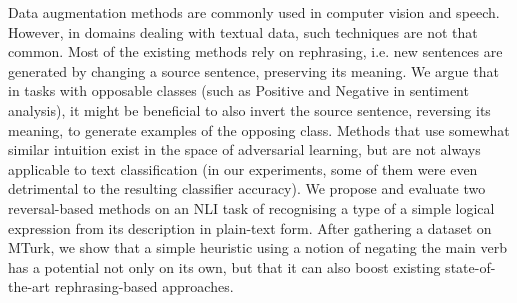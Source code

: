 Data augmentation methods are commonly used in computer vision and speech. However, in domains dealing with textual data, such techniques are not that common. Most of the existing methods rely on rephrasing, i.e. new sentences are generated by changing a source sentence, preserving its meaning. We argue that in tasks with opposable classes (such as Positive and Negative in sentiment analysis), it might be beneficial to also invert the source sentence, reversing its meaning, to generate examples of the opposing class. Methods that use somewhat similar intuition exist in the space of adversarial learning, but are not always applicable to text classification (in our experiments, some of them were even detrimental to the resulting classifier accuracy). We propose and evaluate two reversal-based methods on an NLI task of recognising a type of a simple logical expression from its description in plain-text form. After gathering a dataset on MTurk, we show that a simple heuristic using a notion of negating the main verb has a potential not only on its own, but that it can also boost existing state-of-the-art rephrasing-based approaches.
